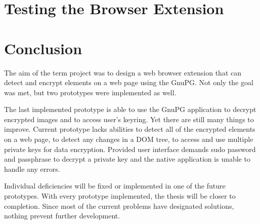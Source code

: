 \chapter{Testing the Browser Extension}


\chapter{Conclusion}
The aim of the term project was to design a web browser extension that can detect and encrypt elements on a web page using the GnuPG. Not only the goal was met, but two prototypes were implemented as well.

The last implemented prototype is able to use the GnuPG application to decrypt encrypted images and to access user's keyring. Yet there are still many things to improve. Current prototype lacks abilities to detect all of the encrypted elements on a web page, to detect any changes in a DOM tree, to access and use multiple private keys for data encryption. Provided user interface demands sudo password and passphrase to decrypt a private key and the native application is unable to handle any errors.

Individual deficiencies will be fixed or implemented in one of the future prototypes. With every prototype implemented, the thesis will be closer to completion. Since most of the current problems have designated solutions, nothing prevent further development.
